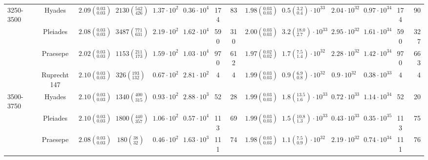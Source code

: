 \begin{tabular}{lccccccccccccr}
3250-3500 & Hyades &  $2.09\left(^{0.03}_{0.03}\right)$ &    $2130\left(^{542}_{426}\right)$ &    $1.37\cdot 10^{2}$ &    $0.36\cdot 10^{4}$ &                174 &                 83 &  $1.98\left(^{0.03}_{0.03}\right)$ &   $0.5\left(^{3.2}_{0.4}\right)\cdot 10^{33}$ &       $2.04\cdot 10^{32}$ &       $0.97\cdot 10^{34}$ &                  174 &                   90 \\
          & Pleiades &  $2.08\left(^{0.03}_{0.03}\right)$ &    $3487\left(^{771}_{631}\right)$ &    $2.19\cdot 10^{2}$ &    $1.62\cdot 10^{4}$ &                590 &                310 &  $2.00\left(^{0.03}_{0.03}\right)$ &  $3.2\left(^{18.0}_{2.7}\right)\cdot 10^{33}$ &       $2.95\cdot 10^{32}$ &       $1.61\cdot 10^{34}$ &                  590 &                  327 \\
          & Praesepe &  $2.02\left(^{0.03}_{0.03}\right)$ &    $1153\left(^{211}_{173}\right)$ &    $1.59\cdot 10^{2}$ &    $1.03\cdot 10^{4}$ &                970 &                612 &  $1.97\left(^{0.02}_{0.02}\right)$ &   $1.7\left(^{7.5}_{1.4}\right)\cdot 10^{32}$ &       $2.28\cdot 10^{32}$ &       $1.42\cdot 10^{34}$ &                  970 &                  663 \\
          & Ruprecht 147 &  $2.10\left(^{0.03}_{0.03}\right)$ &     $326\left(^{193}_{132}\right)$ &    $0.67\cdot 10^{2}$ &    $2.81\cdot 10^{2}$ &                  4 &                  4 &  $1.99\left(^{0.03}_{0.03}\right)$ &   $0.9\left(^{6.9}_{0.8}\right)\cdot 10^{32}$ &        $0.9\cdot 10^{32}$ &       $0.38\cdot 10^{33}$ &                    4 &                    4 \\
3500-3750 & Hyades &  $2.10\left(^{0.03}_{0.03}\right)$ &    $1340\left(^{400}_{315}\right)$ &    $0.93\cdot 10^{2}$ &    $2.88\cdot 10^{3}$ &                 52 &                 28 &  $1.99\left(^{0.03}_{0.03}\right)$ &  $1.8\left(^{13.5}_{1.6}\right)\cdot 10^{33}$ &       $0.72\cdot 10^{33}$ &       $1.14\cdot 10^{34}$ &                   52 &                   20 \\
          & Pleiades &  $2.10\left(^{0.03}_{0.03}\right)$ &    $1800\left(^{440}_{357}\right)$ &    $1.06\cdot 10^{2}$ &    $0.57\cdot 10^{4}$ &                113 &                 69 &  $1.99\left(^{0.03}_{0.03}\right)$ &  $1.5\left(^{10.8}_{1.3}\right)\cdot 10^{33}$ &       $0.43\cdot 10^{33}$ &       $0.35\cdot 10^{35}$ &                  113 &                   75 \\
          & Praesepe &  $2.08\left(^{0.03}_{0.03}\right)$ &       $180\left(^{38}_{32}\right)$ &    $0.46\cdot 10^{2}$ &    $1.63\cdot 10^{3}$ &                111 &                 74 &  $1.98\left(^{0.03}_{0.03}\right)$ &   $1.1\left(^{7.5}_{0.9}\right)\cdot 10^{32}$ &       $2.19\cdot 10^{32}$ &       $0.74\cdot 10^{34}$ &                  111 &                   76 \\

\end{tabular}
